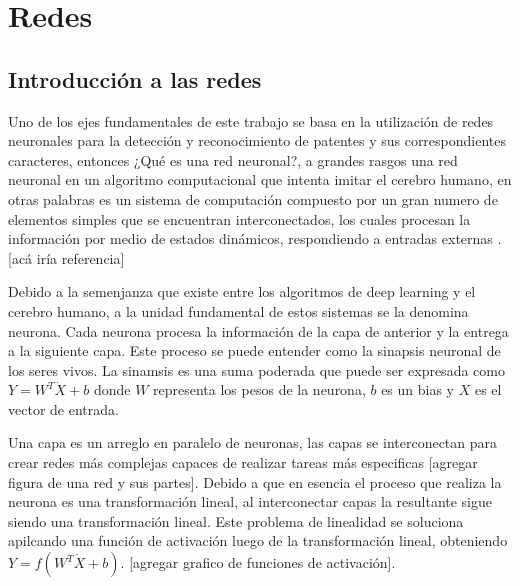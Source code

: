 \section{Redes}

\subsection{Introducción a las redes}

Uno de los ejes fundamentales de este trabajo se basa en la utilización de redes neuronales para la detección y reconocimiento de patentes
y sus correspondientes caracteres, entonces ¿Qué es una red neuronal?, a grandes rasgos una red neuronal en un algoritmo computacional que
intenta imitar el cerebro humano, en otras palabras es un sistema de computación compuesto por un gran numero de elementos simples que se
encuentran interconectados, los cuales procesan la información por medio de estados dinámicos, respondiendo a entradas externas
.[acá iría referencia]

Debido a la semenjanza que existe entre los algoritmos de deep learning y el cerebro humano, a la unidad fundamental de estos sistemas se la
denomina neurona.
Cada neurona procesa la información de la capa de anterior y la entrega a la siguiente capa. Este proceso se puede entender como la sinapsis
neuronal de los seres vivos.
La sinamsis es una suma poderada que puede ser expresada como $Y = W^T\dot X + b$ donde $W$ representa los pesos de la neurona, $b$ es un bias
y $X$ es el vector de entrada.

Una capa es un arreglo en paralelo de neuronas, las capas se interconectan para crear redes más complejas capaces de realizar tareas más
especificas [agregar figura de una red y sus partes].
Debido a que en esencia el proceso que realiza la neurona es una transformación lineal, al interconectar capas la resultante sigue siendo
una transformación lineal. Este problema de linealidad se soluciona apilcando una función de activación luego de la transformación lineal,
obteniendo $Y=f(W^T \dot X + b)$. [agregar grafico de funciones de activación].

